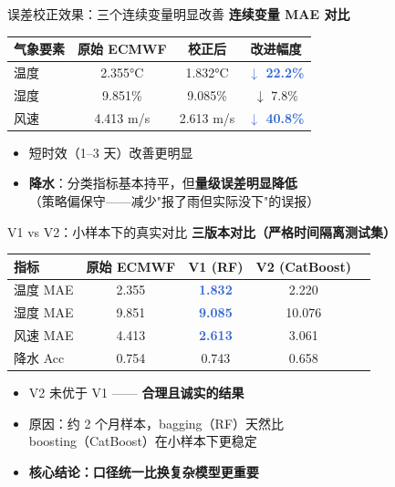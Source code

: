 \documentclass[aspectratio=169,14pt]{beamer}
\begin{document}
\begin{frame}{误差校正效果：三个连续变量明显改善}
  \centering
  \vspace{2mm}
  {\Large\textbf{连续变量 MAE 对比}}
  \vspace{4mm}
  \begin{tabular}{lccc}
    \toprule
    \textbf{气象要素} & \textbf{原始 ECMWF} & \textbf{校正后} & \textbf{改进幅度} \\
    \midrule
    温度 & 2.355°C & 1.832°C & \textcolor{highlight}{\textbf{$\downarrow$ 22.2\%}} \\
    湿度 & 9.851\% & 9.085\% & $\downarrow$ 7.8\% \\
    风速 & 4.413 m/s & 2.613 m/s & \textcolor{highlight}{\textbf{$\downarrow$ 40.8\%}} \\
    \bottomrule
  \end{tabular}
  \vspace{4mm}
  \begin{itemize}
    \item 短时效（1--3 天）改善更明显
    \item \textbf{降水}：分类指标基本持平，但\textbf{量级误差明显降低}\\{\small （策略偏保守——减少"报了雨但实际没下"的误报）}
  \end{itemize}
\end{frame}

\begin{frame}{V1 vs V2：小样本下的真实对比}
  \centering
  \vspace{2mm}
  {\Large\textbf{三版本对比（严格时间隔离测试集）}}
  \vspace{3mm}
  \begin{tabular}{lcccc}
    \toprule
    \textbf{指标} & \textbf{原始 ECMWF} & \textbf{V1 (RF)} & \textbf{V2 (CatBoost)} \\
    \midrule
    温度 MAE & 2.355 & \textcolor{highlight}{\textbf{1.832}} & 2.220 \\
    湿度 MAE & 9.851 & \textcolor{highlight}{\textbf{9.085}} & 10.076 \\
    风速 MAE & 4.413 & \textcolor{highlight}{\textbf{2.613}} & 3.061 \\
    降水 Acc & 0.754 & 0.743 & 0.658 \\
    \bottomrule
  \end{tabular}
  \vspace{4mm}
  \begin{itemize}
    \item V2 未优于 V1 —— \textbf{合理且诚实的结果}
    \item 原因：约 2 个月样本，bagging（RF）天然比\\boosting（CatBoost）在小样本下更稳定
    \item \textbf{核心结论：口径统一比换复杂模型更重要}
  \end{itemize}
\end{frame}
\end{document}

